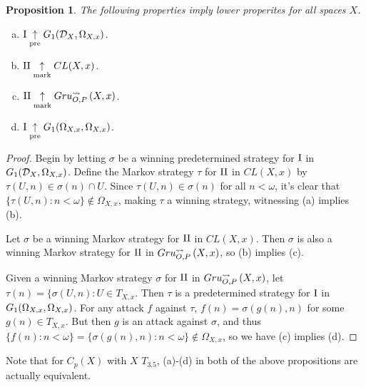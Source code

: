 \documentclass{amsart}
\theoremstyle{plain}
\newtheorem{proposition}[theorem]{Proposition}
\theoremstyle{definition}
\theoremstyle{remark}
\theoremstyle{plain}
\theoremstyle{definition}
\theoremstyle{remark}
\begin{document}
\begin{proposition}
 The following properties imply lower properites for all spaces \(X\).
 \begin{enumerate}[a)]
  \item \(\mathrm{I}\underset{\text{pre}}{\uparrow}G_{1}(\mathcal{D}_X,\Omega_{X,x})\).
  \item \(\mathrm{II}\underset{\text{mark}}{\uparrow} CL(X,x)\).
  \item \(\mathrm{II}\underset{\text{mark}}{\uparrow}Gru_{O,P}^{\leadsto}\left({X},{x}\right)\).
  \item \(\mathrm{I}\underset{\text{pre}}{\uparrow}G_{1}(\Omega_{X,x},\Omega_{X,x})\).
 \end{enumerate}
\end{proposition}
\begin{proof}
 Begin by letting \(\sigma\) be a winning predetermined strategy for \(\mathrm{I}\) in \(G_{1}(\mathcal{D}_X,\Omega_{X,x})\). 
 Define the Markov strategy \(\tau\) for \(\mathrm{II}\) in \(CL(X,x)\) by \(\tau(U,n)\in\sigma(n)\cap U\). 
 Since \(\tau(U,n)\in\sigma(n)\) for all \(n<\omega\), it's clear that \(\{\tau(U,n):n<\omega\}\not\in\Omega_{X,x}\), making \(\tau\) a winning strategy, witnessing (a) implies (b).

 Let \(\sigma\) be a winning Markov strategy for \(\mathrm{II}\) in \(CL(X,x)\). Then \(\sigma\) is also a winning Markov strategy for \(\mathrm{II}\) in \(Gru_{O,P}^{\leadsto}\left({X},{x}\right)\), so (b) implies (c).

 Given a winning Markov strategy \(\sigma\) for \(\mathrm{II}\) in \(Gru_{O,P}^{\leadsto}\left({X},{x}\right)\), let \(\tau(n)=\{\sigma(U,n):U\in T_{X,x}\). 
 Then \(\tau\) is a predetermined strategy for \(\mathrm{I}\) in \(G_{1}(\Omega_{X,x},\Omega_{X,x})\). 
 For any attack \(f\) against \(\tau\), \(f(n)=\sigma(g(n),n)\) for some \(g(n)\in T_{X,x}\). 
 But then \(g\) is an attack against \(\sigma\), and thus \(\{f(n):n<\omega\}=\{\sigma(g(n),n):n<\omega\}\not\in\Omega_{X,x}\), so we have (c) implies (d).
\end{proof}

Note that for \(C_p(X)\) with \(X\) \(T_{3.5}\), (a)-(d) in both of the above propositions are actually equivalent.
\end{document}
